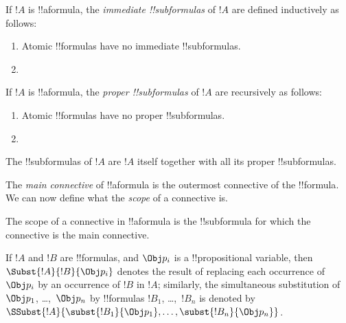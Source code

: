 \documentclass[../../../include/open-logic-section]{subfiles}
\begin{document}
\begin{defn}
If $!A$ is !!a{formula}, the \emph{immediate !!{subformula}s}
of $!A$ are defined inductively as follows:
\begin{enumerate}
\item Atomic !!{formula}s have no immediate !!{subformula}s.


\item {}

\end{enumerate}
\end{defn}

\begin{defn}
If $!A$ is !!a{formula}, the \emph{proper !!{subformula}s}
of $!A$ are recursively as follows:
\begin{enumerate}
\item Atomic !!{formula}s have no proper !!{subformula}s.


\item {}
\end{enumerate}
\end{defn}

\begin{defn}[!!^{subformula}]
The !!{subformula}s of $!A$ are $!A$ itself together with all its
proper !!{subformula}s.
\end{defn}

The \emph{main connective} of !!a{formula} is the outermost connective of 
the !!{formula}. We can now define what the \emph{scope} of a connective is.

\begin{defn}[Scope]
The scope of a connective in !!a{formula} is the !!{subformula}
for which the connective is the main connective.
\end{defn}

\begin{defn}
If $!A$ and $!B$ are !!{formula}s, and $\Obj p_i$ is a !!{propositional
variable}, then $\Subst{!A}{!B}{\Obj p_i}$ denotes the result of
replacing each occurrence of $\Obj p_i$ by an occurrence of $!B$ in $!A$;
similarly, the simultaneous substitution of $\Obj p_1$, \dots,~$\Obj p_n$ by
!!{formula}s $!B_1$, \dots,~$!B_n$ is denoted by
$\SSubst{!A}{\subst{!B_1}{\Obj p_1},\dots,\subst{!B_n}{\Obj p_n}}$.
\end{defn}
\end{document}
